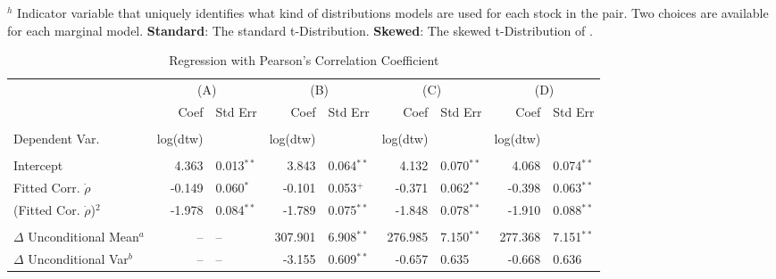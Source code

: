 \documentclass[12pt]{report}
\begin{document}
\begin{table}
\begin{tablenotes}
        \item {$^{h}$ Indicator variable that uniquely identifies what kind of distributions models are used for each stock in the pair. Two choices are available for each marginal model. \textbf{Standard}: The standard t-Distribution. \textbf{Skewed}: The skewed t-Distribution of \cite{FernandezSteel1998}.}
    \end{tablenotes}
    \label{tbl:correlation_to_log_dtw_regression}
\end{table}


\begin{table}
    \fontsize{8pt}{8pt}\selectfont
    \caption{Regression with Pearson's Correlation Coefficient}
    \centering
    \begin{tabular}{l r l r l r l r l}
        \midrule
        & \multicolumn{2}{c}{(A)} & \multicolumn{2}{c}{(B)} & \multicolumn{2}{c}{(C)} & \multicolumn{2}{c}{(D)}  \\
         & Coef & Std Err & Coef & Std Err & Coef & Std Err & Coef & Std Err  \\
        \midrule
                                                                                                                                                 \\
        Dependent Var.                     & log(dtw)&              & log(dtw)&               & log(dtw)&              & log(dtw)&               \\
                                                                                                                                                 \\
        Intercept                          &  4.363 & 0.013$^{**}$  &   3.843 & 0.064$^{**}$ &   4.132 & 0.070$^{**}$  &   4.068 & 0.074$^{**}$  \\
        Fitted Corr. $\dot{\rho}$          & -0.149 & 0.060$^{*}$   &  -0.101 & 0.053$^{+}$  &  -0.371 & 0.062$^{**}$  &  -0.398 & 0.063$^{**}$  \\
        (Fitted Cor. $\dot{\rho}$)$^{2}$   & -1.978 & 0.084$^{**}$  &  -1.789 & 0.075$^{**}$ &  -1.848 & 0.078$^{**}$  &  -1.910 & 0.088$^{**}$  \\  \\
        $\Delta$ Unconditional Mean$^{a}$  &     -- & --            & 307.901 & 6.908$^{**}$ & 276.985 & 7.150$^{**}$  & 277.368 & 7.151$^{**}$  \\
        $\Delta$ Unconditional Var$^{b}$   &     -- & --            &  -3.155 & 0.609$^{**}$ &  -0.657 & 0.635         &  -0.668 & 0.636         \\

\end{tabular}
\end{table}
\end{document}
